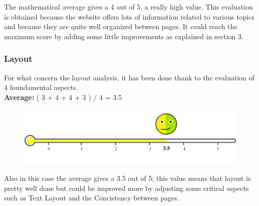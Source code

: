 The mathematical average gives a 4 out of 5, a really high value. This evaluation is obtained because the website offers lots of information related to various topics and because they are quite well organized between pages. It could reach the maximum score by adding some little improvements as explained in section 3.

\subsubsection*{Layout}
For what concern the layout analysis, it has been done thank to the evaluation of 4 foundamental aspects.\\
\textbf{Average: } ( 3 + 4 + 4 + 3 ) / 4 = 3.5 \\
\begin{figure}[h!]
	\centering
	\begin{minipage}[b]{1\textwidth}
    		\includegraphics[width=1\textwidth]{./assets/layout-navigation-value.png}
	\end{minipage}
\end{figure}
\FloatBarrier

Also in this case the average gives a 3.5 out of 5; this value means that layout is pretty well done but could be improved more by adjusting some critical aspects such as Text Layout and the Concistency between pages.